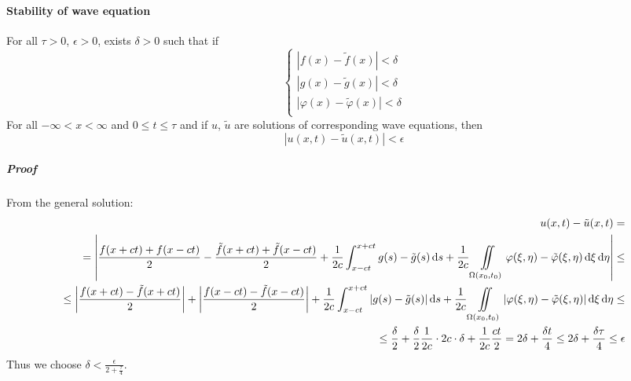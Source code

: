 \paragraph{Stability of wave equation}
For all $\tau > 0 $, $\epsilon >0$, exists $\delta >0$ such that if 
$$\begin{cases}
|f(x) - \tilde{f}(x) | < \delta\\
|g(x) - \tilde{g}(x) | < \delta\\
|\varphi(x) - \tilde{\varphi}(x) | < \delta\\
\end{cases}$$
For all $-\infty < x < \infty$ and $0 \leq t \leq \tau$ and if $u$, $\tilde{u}$ are solutions of corresponding wave equations, then
$$|u(x,t) - \tilde{u}(x,t)| < \epsilon$$
\subparagraph{Proof}
From the general solution:
\begin{align*}
u(x,t) - \tilde{u}(x,t) =\\= \qty|\frac{f(x+ct) + f(x-ct)}{2} - \frac{\tilde{f}(x+ct) + \tilde{f}(x-ct)}{2} + \frac{1}{2c}\int_{x-ct}^{x+ct} g(s) - \tilde{g}(s)\dd{s}  + \frac{1}{2c}\iint\limits_{\Omega(x_0, t_0)} \varphi(\xi, \eta) - \tilde{\varphi}(\xi, \eta)\dd{\xi} \dd{\eta}| \leq\\\leq \qty|\frac{f(x+ct) - \tilde{f}(x+ct)}{2}| + \qty|\frac{f(x-ct) - \tilde{f}(x-ct)}{2}| + \frac{1}{2c}\int_{x-ct}^{x+ct} \qty|g(s) - \tilde{g}(s)|\dd{s}  + \frac{1}{2c}\iint\limits_{\Omega(x_0, t_0)} \qty|\varphi(\xi, \eta) - \tilde{\varphi}(\xi, \eta)|\dd{\xi} \dd{\eta} \leq\\\leq \frac{\delta}{2}+\frac{\delta}{2} \frac{1}{2c} \cdot 2c \cdot \delta + \frac{1}{2c} \frac{ct}{2} = 2\delta + \frac{\delta t}{4} \leq 2\delta + \frac{\delta \tau}{4} \leq \epsilon
\end{align*}
Thus we choose $\delta < \frac{\epsilon}{2+\frac{\tau}{4}}$.